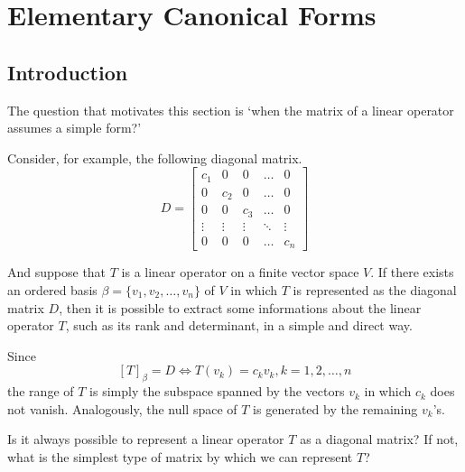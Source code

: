 \chapter{Elementary Canonical Forms}

\section{Introduction}

The question that motivates this section is `when the matrix of a linear operator assumes a simple form?'

Consider, for example, the following diagonal matrix.
\[
D = \begin{bmatrix}
c_1 & 0 & 0 & \ldots & 0 \\
0 & c_2 & 0 & \ldots & 0 \\
0 & 0 & c_3 & \ldots & 0 \\
\vdots & \vdots & \vdots & \ddots & \vdots \\
0 & 0 & 0 & \ldots & c_n
\end{bmatrix}
\]

And suppose that $T$ is a linear operator on a finite vector space $V$. If there exists an ordered basis $\beta = \{ v_1, v_2, \ldots, v_n \}$ of $V$ in which $T$ is represented as the diagonal matrix $D$, then it is possible to extract some informations about the linear operator $T$, such as its rank and determinant, in a simple and direct way.

Since 
\[
[T]_\beta = D \iff T(v_k) = c_k v_k, k = 1, 2, \ldots, n
\]
the range of $T$ is simply the subspace spanned by the vectors $v_k$ in which $c_k$ does not vanish. Analogously, the null space  of $T$ is generated by the remaining $v_k$'s. 

Is it always possible to represent a linear operator $T$ as a diagonal matrix? If not, what is the simplest type of matrix by which we can represent $T$?

%	
